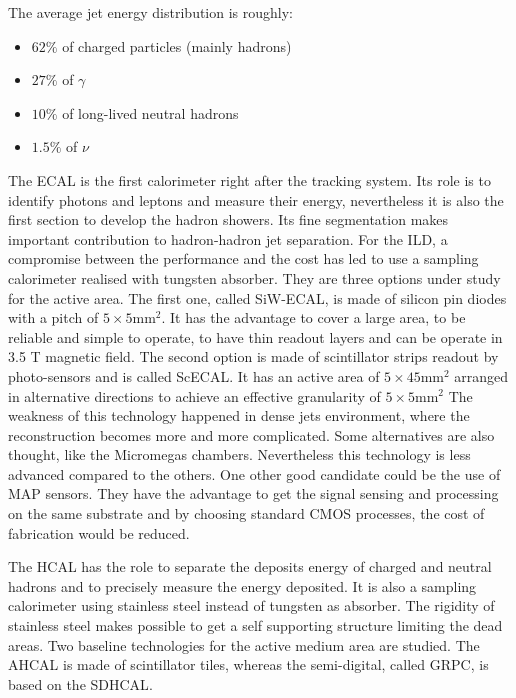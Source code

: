       The average jet energy distribution is roughly: 
      \begin{itemize}
        \item $62 \%$ of charged particles (mainly hadrons)
        \item $27 \%$ of $\gamma$
        \item $10 \%$ of long-lived neutral hadrons
        \item $1.5 \%$ of $\nu$
      \end{itemize}

      The \gls{ECAL} is the first calorimeter right after the tracking system.
      Its role is to identify photons and leptons and measure their energy, nevertheless it is also the first section to develop the hadron showers.
      Its fine segmentation makes important contribution to hadron-hadron jet separation.
      For the \gls{ILD}, a compromise between the performance and the cost has led to use a sampling calorimeter realised with tungsten absorber.
      They are three options under study for the active area.
      The first one, called SiW-ECAL, is made of silicon pin diodes with a pitch of $5 \times 5 \text{mm}^2$. 
      It has the advantage to cover a large area, to be reliable and simple to operate, to have thin readout layers and can be operate in 3.5 T magnetic field.
      The second option is made of scintillator strips readout by photo-sensors and is called ScECAL.
      It has an active area of $5 \times 45 \text{mm}^2$ arranged in alternative directions to achieve an effective granularity of $5 \times 5 \text{mm}^2$ 
      The weakness of this technology happened in dense jets environment, where the reconstruction becomes more and more complicated.
      Some alternatives are also thought, like the Micromegas chambers. Nevertheless this technology is less advanced compared to the others.
      One other good candidate could be the use of \gls{MAP} sensors.
      They have the advantage to get the signal sensing and processing on the same  substrate and by choosing standard CMOS processes, the cost of fabrication would be reduced.

      The  \gls{HCAL} has the role to separate the deposits energy of charged and neutral hadrons and to precisely measure the energy deposited.
      It is also a sampling calorimeter using stainless steel instead of tungsten as absorber. 
      The rigidity of stainless steel makes possible to get a self supporting structure limiting the dead areas.
      Two baseline technologies for the active medium area are studied.
      The  \gls{AHCAL} is made of scintillator tiles, whereas the semi-digital, called \gls{GRPC}, is based on the \gls{SDHCAL}.

